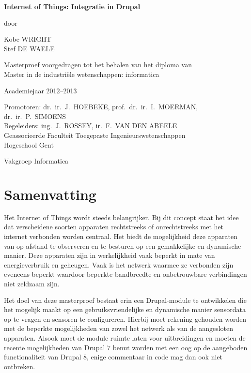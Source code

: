 
\newpage

{
\setlength{\baselineskip}{14pt}
\setlength{\parindent}{0pt}
\setlength{\parskip}{8pt}

\begin{center}

\noindent \textbf{\huge
Internet of Things: Integratie in Drupal
}

door 

Kobe WRIGHT\\
Stef DE WAELE

Masterproef voorgedragen tot het behalen van het diploma van\\
Master in de industri\"{e}le wetenschappen: informatica

Academiejaar 2012--2013

Promotoren: dr.~ir.~J.~HOEBEKE, prof.~dr.~ir.~I.~MOERMAN, dr.~ir.~P.~SIMOENS\\
Begeleiders: ing.~J.~ROSSEY, ir.~F.~VAN DEN ABEELE\\

Geassocieerde Faculteit Toegepaste Ingenieurswetenschappen\\
Hogeschool Gent

Vakgroep Informatica

\end{center}

\section*{Samenvatting}


Het Internet of Things wordt steeds belangrijker. Bij dit concept staat het idee dat verscheidene soorten apparaten rechtstreeks of onrechtstreeks met het internet verbonden worden centraal. Het biedt de mogelijkheid deze apparaten van op afstand te observeren en te besturen op een gemakkelijke en dynamische manier. Deze apparaten zijn in werkelijkheid vaak beperkt in mate van energieverbruik en geheugen. Vaak is het netwerk waarmee ze verbonden zijn eveneens beperkt waardoor beperkte bandbreedte en onbetrouwbare verbindingen niet zeldzaam zijn.

Het doel van deze masterproef bestaat erin een Drupal-module te ontwikkelen die het mogelijk maakt op een gebruiksvriendelijke en dynamische manier sensordata op te vragen en sensoren te configureren. Hierbij moet rekening gehouden worden met de beperkte mogelijkheden van zowel het netwerk als van de aangesloten apparaten. Alsook moet de module ruimte laten voor uitbreidingen en moeten de recente mogelijkheden van Drupal 7 benut worden met een oog op de aangeboden functionaliteit van Drupal 8, enige commentaar in code mag dan ook niet ontbreken.

}
